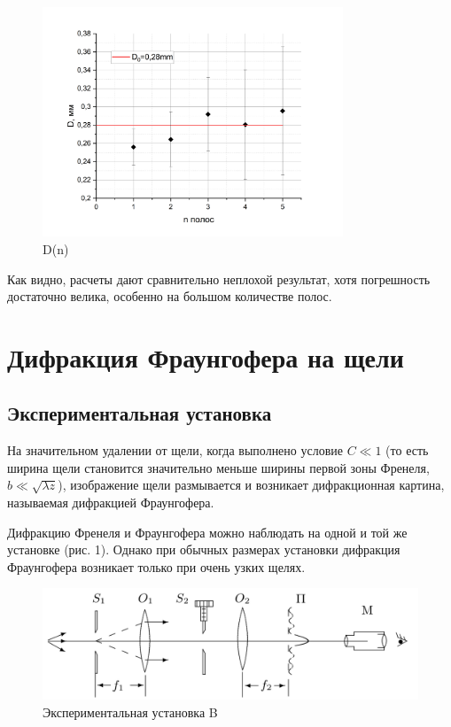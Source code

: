 \documentclass[a4paper, 12pt]{article}
\begin{document}
\begin{figure}[h!]
    \begin{center}
    \includegraphics[width=0.8\textwidth]{graph1.png}
    \end{center}
    \caption{D(n)}
\end{figure}
Как видно, расчеты дают сравнительно неплохой результат, хотя погрешность достаточно велика, особенно на большом количестве полос.

\newpage

\section{Дифракция Фраунгофера на щели}
	
\subsection{Экспериментальная установка}
На значительном удалении от щели, когда выполнено условие $ C \ll 1 $
(то есть ширина щели становится значительно меньше ширины первой
зоны Френеля, $ b \ll \sqrt{\lambda z} $), изображение щели размывается и возникает
дифракционная картина, называемая дифракцией Фраунгофера.

Дифракцию Френеля и Фраунгофера можно наблюдать на одной
и той же установке (рис. 1). Однако при обычных размерах установки дифракция Фраунгофера возникает только при очень узких щелях.

	\begin{figure}[h!]
		\centering
		\includegraphics[width=0.8\linewidth]{b.png}
		\caption{Экспериментальная установка B}
		\label{labB}
	\end{figure}
\end{document}
